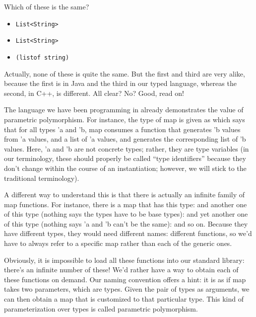 
Which of these is the same?
\begin{itemize}[nosep]
  \item 
\verb|List<String>|
  \item 
\verb|List<String>|
  \item 
\verb|(listof string)|
\end{itemize}

Actually, none of these is quite the same. But the first and third are very
alike, because the first is in Java and the third in our typed language, whereas
the second, in C++, is different. All clear? No? Good, read on!

\secdown


The language we have been programming in already demonstrates the value of
parametric polymorphism. For instance, the type of map is given as
which says that for all types 'a and 'b, map consumes a function that generates
'b values from 'a values, and a list of 'a values, and generates the
corresponding list of 'b values. Here, 'a and 'b are not concrete types; rather,
they are type variables (in our terminology, these should properly be called
“type identifiers” because they don’t change within the course of an
instantiation; however, we will stick to the traditional terminology).

A different way to understand this is that there is actually an infinite family
of map functions. For instance, there is a map that has this type:
and another one of this type (nothing says the types have to be base types):
and yet another one of this type (nothing says 'a and 'b can’t be the same):
and so on. Because they have different types, they would need different names:
different functions, so we’d have to always refer to a specific map rather than
each of the generic ones.

Obviously, it is impossible to load all these functions into our standard
library: there’s an infinite number of these! We’d rather have a way to obtain
each of these functions on demand. Our naming convention offers a hint: it is as
if map takes two parameters, which are types. Given the pair of types as
arguments, we can then obtain a map that is customized to that particular type.
This kind of parameterization over types is called parametric polymorphism.

